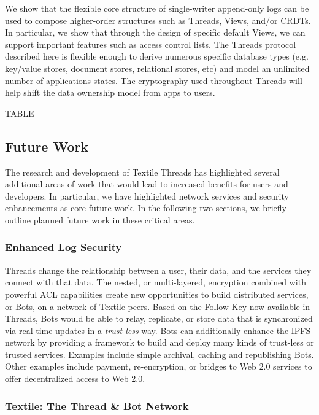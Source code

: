 \documentclass{textile}
\begin{document}
We show that the flexible core structure of single-writer append-only logs can be used to compose higher-order structures such as Threads, Views, and/or CRDTs. In particular, we show that through the design of specific default Views, we can support important features such as access control lists. The Threads protocol described here is flexible enough to derive numerous specific database types (e.g. key/value stores, document stores, relational stores, etc) and model an unlimited number of applications states. The cryptography used throughout Threads will help shift the data ownership model from apps to users. 

TABLE

\subsection{Future Work}

The research and development of Textile Threads has highlighted several additional areas of work that would lead to increased benefits for users and developers. In particular, we have highlighted network services and security enhancements as core future work. In the following two sections, we briefly outline planned future work in these critical areas.

\subsubsection{Enhanced Log Security}

Threads change the relationship between a user, their data, and the services they connect with that data. The nested, or multi-layered, encryption combined with powerful ACL capabilities create new opportunities to build distributed services, or Bots, on a network of Textile peers. Based on the Follow Key now available in Threads, Bots would be able to relay, replicate, or store data that is synchronized via real-time updates in a \emph{trust-less} way. Bots can additionally enhance the IPFS network by providing a framework to build and deploy many kinds of trust-less or trusted services. Examples include simple archival, caching and republishing Bots. Other examples include payment, re-encryption, or bridges to Web 2.0 services to offer decentralized access to Web 2.0.

\subsubsection{Textile: The Thread \& Bot Network} \label{sec:Bots}
\end{document}
